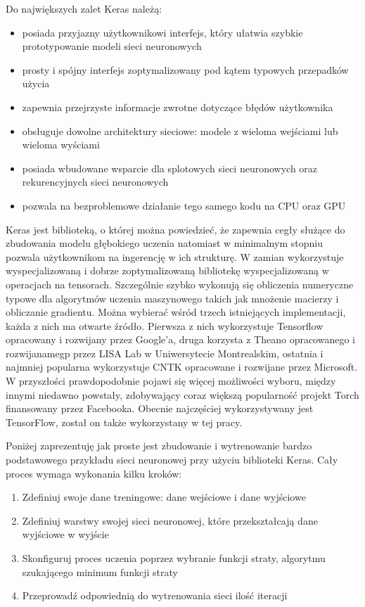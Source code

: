 \documentclass[11pt]{book}
\theoremstyle{definition}
\begin{document}
Do największych zalet Keras należą:
\begin{itemize}
	\setlength\itemsep{0.em}
	
	\item  posiada przyjazny użytkownikowi interfejs, który ułatwia szybkie prototypowanie modeli sieci neuronowych
	\item  prosty i spójny interfejs zoptymalizowany pod kątem typowych przepadków użycia
	\item  zapewnia przejrzyste informacje zwrotne dotyczące błędów użytkownika
	\item  obsługuje dowolne architektury sieciowe: modele z wieloma wejściami lub wieloma wyściami
	\item posiada wbudowane wsparcie dla splotowych sieci neuronowych oraz rekurencyjnych sieci neuronowych
	\item  pozwala na bezproblemowe działanie tego samego kodu na CPU oraz GPU
\end{itemize}


Keras jest biblioteką, o której można powiedzieć, że zapewnia cegły służące do zbudowania modelu głębokiego uczenia natomiast w minimalnym stopniu pozwala użytkownikom na ingerencję w ich strukturę. W zamian wykorzystuje wyspecjalizowaną i dobrze zoptymalizowaną bibliotekę wyspecjalizowaną w operacjach na tensorach. Szczególnie szybko wykonują się obliczenia numeryczne typowe dla algorytmów uczenia maszynowego takich jak mnożenie macierzy i obliczanie gradientu.  Można wybierać wśród trzech istniejących implementacji, każda z nich ma otwarte źródło. Pierwsza z nich wykorzystuje Tensorflow opracowany i rozwijany przez Google'a, druga korzysta z Theano opracowanego i rozwijanamegp przez LISA Lab w Uniwersytecie Montrealskim, ostatnia i najmniej popularna wykorzystuje CNTK opracowane i rozwijane przez Microsoft. W przyszłości prawdopodobnie pojawi się więcej możliwości wyboru, między innymi niedawno powstały, zdobywający coraz większą popularność projekt Torch finansowany przez Facebooka. Obecnie najczęściej wykorzystywany jest TensorFlow, został on także wykorzystany w tej pracy. 


Poniżej zaprezentuję jak proste jest zbudowanie i wytrenowanie bardzo podstawowego przykładu sieci neuronowej przy użyciu biblioteki Keras. Cały proces wymaga wykonania kilku kroków:
\begin{enumerate}
	\setlength\itemsep{0.em}
	\item Zdefiniuj swoje dane treningowe: dane wejściowe i dane wyjściowe
	\item Zdefiniuj warstwy swojej sieci neuronowej, które przekształcają dane wyjściowe w wyjście
	\item Skonfiguruj proces uczenia poprzez wybranie funkcji straty, algorytmu szukającego minimum funkcji straty
	\item Przeprowadź odpowiednią do wytrenowania sieci ilość iteracji
\end{enumerate}
\end{document}
